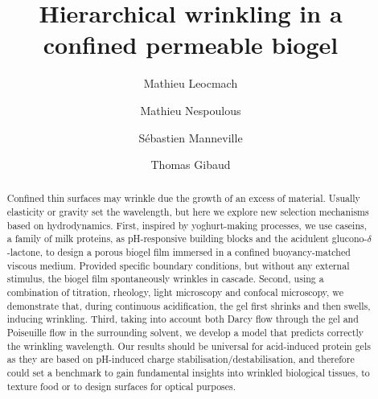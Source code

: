 \documentclass[twocolumn,superscriptaddress,showpacs,preprintnumbers, amsmath,amssymb,prl]{revtex4-1}
\begin{document}
\title{Hierarchical wrinkling in a confined permeable biogel}
\author{Mathieu Leocmach}
\author{Mathieu Nespoulous}
\author{Sébastien Manneville}
\author{Thomas Gibaud}

\begin{abstract}
Confined thin surfaces may wrinkle due the growth of an excess of material. Usually elasticity or gravity set the wavelength, but here we explore new selection mechanisms based on hydrodynamics.
First, inspired by yoghurt-making processes, we use caseins, a family of milk proteins, as pH-responsive building blocks and the acidulent glucono-$\delta$-lactone, to design a porous biogel film immersed in a confined buoyancy-matched viscous medium.
Provided specific boundary conditions, but without any external stimulus, the biogel film spontaneously wrinkles in cascade.
Second, using a combination of titration, rheology, light microscopy and confocal microscopy, we demonstrate that, during continuous acidification, the gel first shrinks and then swells, inducing wrinkling. 
Third, taking into account both Darcy flow through the gel and Poiseuille flow in the surrounding solvent, we develop a model that predicts correctly the wrinkling wavelength. Our results should be universal for acid-induced protein gels as they are based on pH-induced charge stabilisation/destabilisation, and therefore could set a benchmark to gain fundamental insights into wrinkled biological tissues, to texture food or to design surfaces for optical purposes.
\end{abstract}

\maketitle

\end{document}
